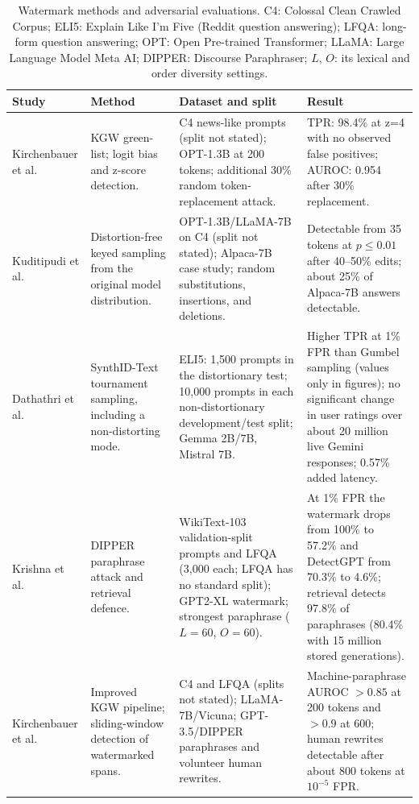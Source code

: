 \documentclass[11pt]{article}
\begin{document}
\begin{table}[!t]
\centering\scriptsize
\begin{tabularx}{\textwidth}{>{\raggedright\arraybackslash}p{} >{\raggedright\arraybackslash}p{} >{\raggedright\arraybackslash}p{} >{\raggedright\arraybackslash}X}
\toprule
\textbf{Study} & \textbf{Method} & \textbf{Dataset and split} & \textbf{Result}\\
\midrule
Kirchenbauer et al. \cite{kirchenbauer2023watermark} & KGW green-list; logit bias and z-score detection. & C4 news-like prompts (split not stated); OPT-1.3B at 200 tokens; additional 30\% random token-replacement attack. & TPR: 98.4\% at z=4 with no observed false positives; AUROC: 0.954 after 30\% replacement.\\
Kuditipudi et al. \cite{kuditipudi2024distortionfree} & Distortion-free keyed sampling from the original model distribution. & OPT-1.3B/LLaMA-7B on C4 (split not stated); Alpaca-7B case study; random substitutions, insertions, and deletions. & Detectable from 35 tokens at $p\leq0.01$ after 40--50\% edits; about 25\% of Alpaca-7B answers detectable.\\
Dathathri et al. \cite{dathathri2024scalable} & SynthID-Text tournament sampling, including a non-distorting mode. & ELI5: 1,500 prompts in the distortionary test; 10,000 prompts in each non-distortionary development/test split; Gemma 2B/7B, Mistral 7B. & Higher TPR at 1\% FPR than Gumbel sampling (values only in figures); no significant change in user ratings over about 20 million live Gemini responses; 0.57\% added latency.\\
Krishna et al. \cite{krishna2023paraphrasing} & DIPPER paraphrase attack and retrieval defence. & WikiText-103 validation-split prompts and LFQA (3,000 each; LFQA has no standard split); GPT2-XL watermark; strongest paraphrase ($L=60$, $O=60$). & At 1\% FPR the watermark drops from 100\% to 57.2\% and DetectGPT from 70.3\% to 4.6\%; retrieval detects 97.8\% of paraphrases (80.4\% with 15 million stored generations).\\
Kirchenbauer et al. \cite{kirchenbauer2024reliability} & Improved KGW pipeline; sliding-window detection of watermarked spans. & C4 and LFQA (splits not stated); LLaMA-7B/Vicuna; GPT-3.5/DIPPER paraphrases and volunteer human rewrites. & Machine-paraphrase AUROC $>0.85$ at 200 tokens and $>0.9$ at 600; human rewrites detectable after about 800 tokens at $10^{-5}$ FPR.\\
\bottomrule
\end{tabularx}
\caption{Watermark methods and adversarial evaluations. C4: Colossal Clean Crawled Corpus; ELI5: Explain Like I'm Five (Reddit question answering); LFQA: long-form question answering; OPT: Open Pre-trained Transformer; LLaMA: Large Language Model Meta AI; DIPPER: Discourse Paraphraser; $L$, $O$: its lexical and order diversity settings.}
\label{tab:watermark}
\end{table}
\end{document}
